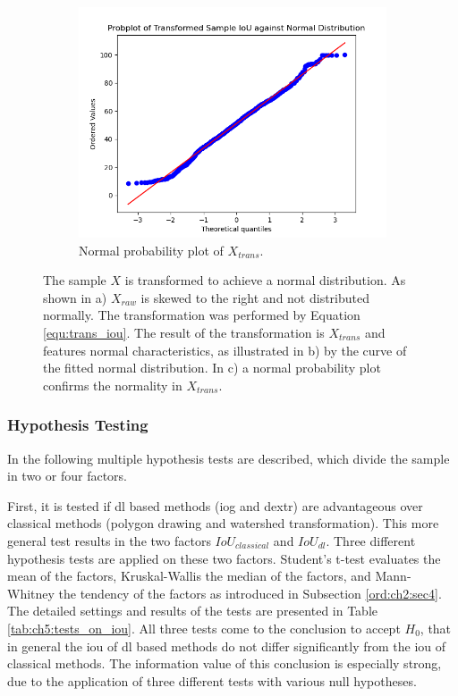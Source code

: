 \begin{figure} [h]
	\hfill
	\begin{subfigure}[t]{0.3\textwidth}
		\centering
		\includegraphics[width=\textwidth]{figures/chap51_iou_probplot.png}
		\caption{
			Normal probability plot of $ X_{trans} $.
		}\label{fig:ch5:sec1:probplot}
	\end{subfigure}
	\caption[IoU Sample Transformation]{		
		The sample $ X $ is transformed to achieve a normal distribution.
		As shown in a) $ X_{raw} $ is skewed to the right and not distributed normally.
		The transformation was performed by Equation \ref{equ:trans_iou}.
		The result of the transformation is $ X_{trans} $ and features normal characteristics, as illustrated in b) by the curve of the fitted normal distribution.
		In c) a normal probability plot confirms the normality in $ X_{trans} $.
	}\label{fig:ch5:sec1:data_transformation_iou}
\end{figure}


\subsubsection{Hypothesis Testing}

In the following multiple hypothesis tests are described, which divide the sample in two or four factors.

First, it is tested if \gls{dl} based methods (\gls{iog} and \gls{dextr}) are advantageous over classical methods (polygon drawing and watershed transformation).
This more general test results in the two factors $ IoU_{classical} $ and $ IoU_{dl} $.
Three different hypothesis tests are applied on these two factors.
Student's t-test evaluates the mean of the factors, Kruskal-Wallis the median of the factors, and Mann-Whitney the tendency of the factors as introduced in Subsection \ref{ord:ch2:sec4}.
The detailed settings and results of the tests are presented in Table \ref{tab:ch5:tests_on_iou}.
All three tests come to the conclusion to accept $ H_{0} $, that in general the \gls{iou} of \gls{dl} based methods do not differ significantly from the \gls{iou} of classical methods.
The information value of this conclusion is especially strong, due to the application of three different tests with various null hypotheses.

